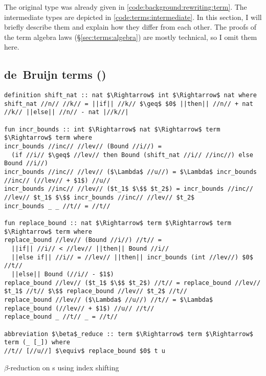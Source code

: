 \noindent
The original  type was already given in \cref{code:background:rewriting:term}.
The intermediate types are depicted in \cref{code:terms:intermediate}.
In this section, I will briefly describe them and explain how they differ from each other.
The proofs of the term algebra laws (§\ref{sec:terms:algebra}) are mostly technical, so I omit them here.

\subsection{de~Bruijn terms ()}
\label{sec:terms:types:term}

\begin{code}
  \begin{lstlisting}[language=Isabelle]
definition shift_nat :: nat $\Rightarrow$ int $\Rightarrow$ nat where
shift_nat //n// //k// = ||if|| //k// $\geq$ $0$ ||then|| //n// + nat //k// ||else|| //n// - nat |//k//|

fun incr_bounds :: int $\Rightarrow$ nat $\Rightarrow$ term $\Rightarrow$ term where
incr_bounds //inc// //lev// (Bound //i//) =
  (if //i// $\geq$ //lev// then Bound (shift_nat //i// //inc//) else Bound //i//)
incr_bounds //inc// //lev// ($\Lambda$ //u//) = $\Lambda$ incr_bounds //inc// (//lev// + $1$) //u//
incr_bounds //inc// //lev// ($t_1$ $\$$ $t_2$) = incr_bounds //inc// //lev// $t_1$ $\$$ incr_bounds //inc// //lev// $t_2$
incr_bounds _ _ //t// = //t//

fun replace_bound :: nat $\Rightarrow$ term $\Rightarrow$ term $\Rightarrow$ term where
replace_bound //lev// (Bound //i//) //t// =
  ||if|| //i// < //lev// ||then|| Bound //i//
  ||else if|| //i// = //lev// ||then|| incr_bounds (int //lev//) $0$ //t//
  ||else|| Bound (//i// - $1$)
replace_bound //lev// ($t_1$ $\$$ $t_2$) //t// = replace_bound //lev// $t_1$ //t// $\$$ replace_bound //lev// $t_2$ //t//
replace_bound //lev// ($\Lambda$ //u//) //t// = $\Lambda$ replace_bound (//lev// + $1$) //u// //t//
replace_bound _ //t// _ = //t//

abbreviation $\beta$_reduce :: term $\Rightarrow$ term $\Rightarrow$ term (_ [_]) where
//t// [//u//] $\equiv$ replace_bound $0$ t u\end{lstlisting}
  \caption{$\beta$-reduction on s using index shifting}
  \label{code:terms:types:beta}
\end{code}

